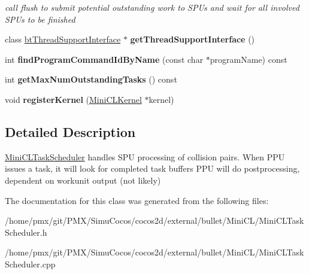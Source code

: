 \begin{DoxyCompactItemize}
\begin{DoxyCompactList}\small\item\em call flush to submit potential outstanding work to S\+P\+Us and wait for all involved S\+P\+Us to be finished \end{DoxyCompactList}\item 
\mbox{\label{classMiniCLTaskScheduler_a9576eb22445a68bc9cf1ca0501b974f0}} 
class \hyperlink{classbtThreadSupportInterface}{bt\+Thread\+Support\+Interface} $\ast$ {\bfseries get\+Thread\+Support\+Interface} ()
\item 
\mbox{\label{classMiniCLTaskScheduler_ad93828a3a1474e5ef5673888d58a46bc}} 
int {\bfseries find\+Program\+Command\+Id\+By\+Name} (const char $\ast$program\+Name) const
\item 
\mbox{\label{classMiniCLTaskScheduler_a341dbc22d09e4e2622080aa653defdf1}} 
int {\bfseries get\+Max\+Num\+Outstanding\+Tasks} () const
\item 
\mbox{\label{classMiniCLTaskScheduler_aeba8cfc17be247623d84e56f735baf0c}} 
void {\bfseries register\+Kernel} (\hyperlink{structMiniCLKernel}{Mini\+C\+L\+Kernel} $\ast$kernel)
\end{DoxyCompactItemize}


\subsection{Detailed Description}
\hyperlink{classMiniCLTaskScheduler}{Mini\+C\+L\+Task\+Scheduler} handles S\+PU processing of collision pairs. When P\+PU issues a task, it will look for completed task buffers P\+PU will do postprocessing, dependent on workunit output (not likely) 

The documentation for this class was generated from the following files\+:\begin{DoxyCompactItemize}
\item 
/home/pmx/git/\+P\+M\+X/\+Simu\+Cocos/cocos2d/external/bullet/\+Mini\+C\+L/Mini\+C\+L\+Task\+Scheduler.\+h\item 
/home/pmx/git/\+P\+M\+X/\+Simu\+Cocos/cocos2d/external/bullet/\+Mini\+C\+L/Mini\+C\+L\+Task\+Scheduler.\+cpp\end{DoxyCompactItemize}
